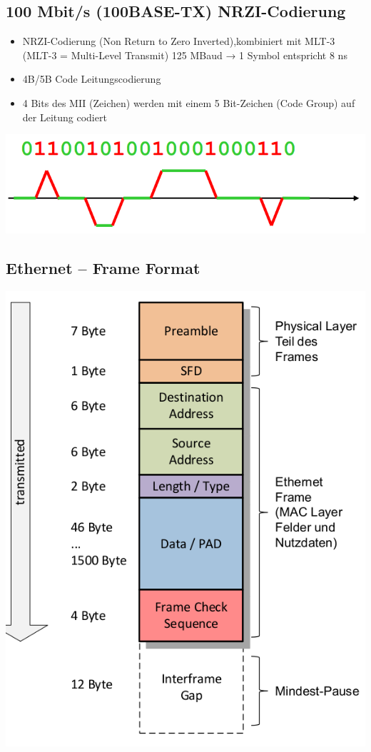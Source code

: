 \subsection{100 Mbit/s (100BASE-TX) NRZI-Codierung }{
    {  \begin{itemize}[noitemsep]
                \item NRZI-Codierung (Non Return to Zero Inverted),kombiniert mit MLT-3 (MLT-3 = Multi-Level Transmit) 125 MBaud → 1 Symbol entspricht 8 ns
                \item 4B/5B Code Leitungscodierung
                \item 4 Bits des MII (Zeichen) werden mit einem 5 Bit-Zeichen (Code Group) auf der Leitung codiert
            \end{itemize}

            \includegraphics[scale=.275]{img/NRZI.png}

        }

    \subsection{Ethernet – Frame Format}{
        \includegraphics[scale=.275]{img/E-Frame.png}

}}
